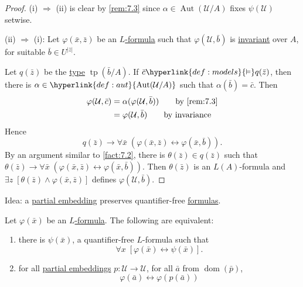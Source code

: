 \documentclass{article}
\let\models\vDash
\DeclareMathOperator{\Aut}{Aut}
\DeclareMathOperator{\dom}{dom}
\DeclareMathOperator{\tp}{tp}
\newcommand{\named}[1]{\textbf{#1}\index{#1}}
\begin{document}
\begin{proof}
  (i) $\Rightarrow$ (ii) is clear by \cref{rem:7.3} since $\alpha \in \Aut(\mathcal{U}/A)$ fixes $\psi(\mathcal{U})$ setwise.

  (ii) $\Rightarrow$ (i): Let $\varphi(\bar{x},\bar{z})$ be an \hyperlink{def:form}{$L$-formula} such that $\varphi(\mathcal{U},\bar{b})$ is \hyperlink{def:inv}{invariant} over $A$, for suitable $ \bar{b} \in U^{|\bar{z}|}$.

  Let $q(\bar{z})$ be the \hyperlink{def:type}{type} $\tp(\bar{b}/A)$.
  If $ \bar{c}\hyperlink{def:models}{\models} q(\bar{z}) $, then there is $ \alpha\in\hyperlink{def:aut}{\Aut(\mathcal{U}/A)}$
  such that $\alpha(\bar{b})=\bar{c}$.
  Then
    \begin{align*}
      \varphi(\mathcal{U},\bar{c})&=\alpha(\varphi(\mathcal{U},\bar{b}))\qquad\text{by \cref{rem:7.3}} \\
                                       &= \varphi(\mathcal{U},\bar{b})\qquad\text{by invariance}
    \end{align*}
  Hence
  \begin{equation*}
    q(\bar{z})\to \forall\bar{x}\;(\varphi(\bar{x},\bar{z})\leftrightarrow\varphi(\bar{x},\bar{b})).
  \end{equation*}
  By an argument similar to \cref{fact:7.2},
  there is $\theta(\bar{z})\in q(\bar{z})$ such that $\theta(\bar{z})\to\forall\bar{x}\;(\varphi(\bar{x},\bar{z})\leftrightarrow\varphi(\bar{x},\bar{b}))$.
  Then $\theta(\bar{z})$ is an $L(A)$-formula and $\exists z\;[\theta(\bar{z})\land\varphi(\bar{x},\bar{z})]$ defines $ \varphi(\mathcal{U},\bar{b}) $.
\end{proof}
Idea: a \hyperlink{def:upe}{partial embedding} preserves quantifier-free \hyperlink{def:form}{formulas}.
\begin{nprop}\label{prop:7.7}
  Let $\varphi(\bar{x})$ be an \hyperlink{def:form}{$L$-formula}. The following are equivalent:
  \begin{enumerate}[label=(\roman*)]
    \item there is $\psi(\bar{x})$, a quantifier-free $L$-formula such that
      \begin{equation*}
        \forall x\; [\varphi(\bar{x}) \leftrightarrow \psi(\bar{x})].
      \end{equation*}
    \item for all \hyperlink{def:upe}{partial embeddings} $p: \mathcal{U} \to \mathcal{U}$, for all $\bar{a}$ from $\dom(\bar{p})$,
      \begin{equation*}
        \varphi(\bar{a}) \leftrightarrow \varphi(p(\bar{a}))
      \end{equation*}
  \end{enumerate}
\end{nprop}
\end{document}
